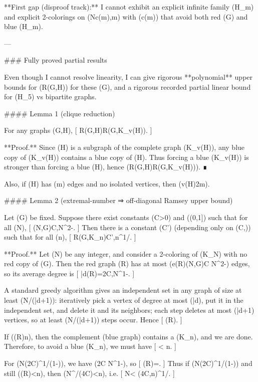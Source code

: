 **First gap (disproof track):** I cannot exhibit an explicit infinite family (H_m) and explicit 2-colorings on (N\ge c(m),m) with (c(m)\to\infty) that avoid both red (G) and blue (H_m).

---

### Fully proved partial results

Even though I cannot resolve linearity, I can give rigorous **polynomial** upper bounds for (R(G,H)) for these (G), and a rigorous recorded partial linear bound for (H_5) vs bipartite graphs.

#### Lemma 1 (clique reduction)

For any graphs (G,H),
[
R(G,H)\le R(G,K_{v(H)}).
]

**Proof.** Since (H) is a subgraph of the complete graph (K_{v(H)}), any blue copy of (K_{v(H)}) contains a blue copy of (H). Thus forcing a blue (K_{v(H)}) is stronger than forcing a blue (H), hence (R(G,H)\le R(G,K_{v(H)})). ∎

Also, if (H) has (m) edges and no isolated vertices, then (v(H)\le 2m).

#### Lemma 2 (extremal-number ⇒ off-diagonal Ramsey upper bound)

Let (G) be fixed. Suppose there exist constants (C>0) and (\varepsilon\in(0,1]) such that for all (N),
[
(N,G)\le C,N^{2-\varepsilon}.
]
Then there is a constant (C') (depending only on (C,\varepsilon)) such that for all (n),
[
R(G,K_n)\le C',n^{1/\varepsilon}.
]

**Proof.** Let (N) be any integer, and consider a 2-coloring of (K_N) with no red copy of (G). Then the red graph (R) has at most (e(R)\le {}(N,G)\le C N^{2-\varepsilon}) edges, so its average degree is
[
\bar d(R)=\le 2C,N^{1-\varepsilon}.
]

A standard greedy algorithm gives an independent set in any graph of size at least (N/(\bar d+1)): iteratively pick a vertex of degree at most (\bar d), put it in the independent set, and delete it and its neighbors; each step deletes at most (\bar d+1) vertices, so at least (N/(\bar d+1)) steps occur. Hence
[
\alpha(R)\ge {}\ge {}.
]

If (\alpha(R)\ge n), then the complement (blue graph) contains a (K_n), and we are done. Therefore, to avoid a blue (K_n), we must have
[
< n.
]

For (N\ge (2C)^{1/(1-\varepsilon)}), we have (2C N^{1-\varepsilon}), so
[
\alpha(R)\ge {}\ge {}=.
]
Thus if (N\ge (2C)^{1/(1-\varepsilon)}) and still (\alpha(R)<n), then (N^{\varepsilon}/(4C)<n), i.e.
[
N< (4C,n)^{1/\varepsilon}.
]

